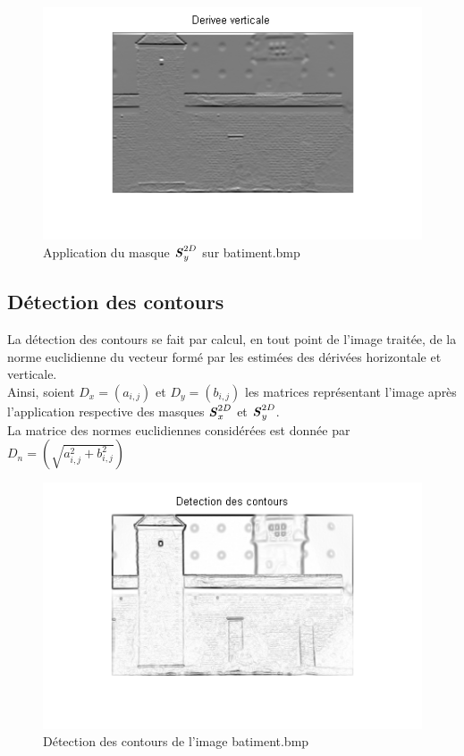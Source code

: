 \documentclass[11pt]{article}
\begin{document}
		\begin{figure}[h]
			\centering
			\includegraphics[scale=1]{img/derivee_verticale.png}
			\caption{Application du masque $\textbf{\textit{S}}_y^{2D}$ sur batiment.bmp}
			\label{img1}
		\end{figure}
	
	\subsection{Détection des contours}

		La détection des contours se fait par calcul, en tout point de l'image traitée, de la norme euclidienne du vecteur formé par les estimées des dérivées horizontale et verticale.\\
		Ainsi, soient $D_x = (a_{i,j})$ et $D_y = (b_{i,j})$ les matrices représentant l'image après l'application respective des masques $\textbf{\textit{S}}_x^{2D}$ et $\textbf{\textit{S}}_y^{2D}$.\\
		La matrice des normes euclidiennes considérées est donnée par $D_n = (\sqrt{a_{i,j}^2 + b_{i,j}^2})$
	
		\begin{figure}[h]
			\centering
			\includegraphics[scale=1]{img/detection_contours.png}
			\caption{Détection des contours de l'image batiment.bmp}
			\label{img1}
		\end{figure}
		
\end{document}
